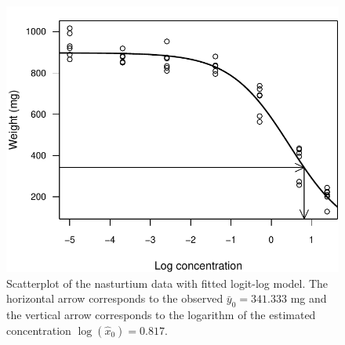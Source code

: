 \documentclass[cmfont,usenames,dvipsnames,leqno]{afit-etd}\usepackage[]{graphicx}\usepackage[]{color}
\makeatletter
\def\maxwidth{ %
  \ifdim\Gin@nat@width>\linewidth
    \linewidth
  \else
    \Gin@nat@width
  \fi
}
\newenvironment{knitrout}{}{} %
\renewenvironment{knitrout}{\begin{singlespace}}{\end{singlespace}}
\newcommand{\wh}[1]{\ensuremath{\widehat{#1}}}
\makeatother
\begin{document}
\begin{knitrout}
\color{fgcolor}\begin{figure}[!htb]

\includegraphics[width=\maxwidth]{figure/nasturtium-scatter} \caption[Scatterplot of the nasturtium data]{Scatterplot of the nasturtium data with fitted logit-log model. The horizontal arrow corresponds to the observed $\bar{y}_0 = 341.333$ mg and the vertical arrow corresponds to the logarithm of the estimated concentration $\log(\wh{x}_0) = 0.817$.\label{fig:nasturtium-scatter}}
\end{figure}


\end{knitrout}
\end{document}
